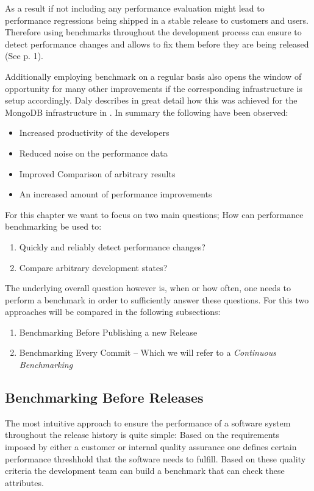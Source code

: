 \documentclass[	runningheads,
				a4paper]{llncs}
\begin{document}
	As a result if not including any performance evaluation might lead to performance regressions being shipped in a stable release to customers and users. Therefore using benchmarks throughout the development process can ensure to detect performance changes and allows to fix them before they are being released (See \cite{daly2021} p. 1). 

	Additionally employing benchmark on a regular basis also opens the window of opportunity for many other improvements if the corresponding infrastructure is setup accordingly. Daly describes in great detail how this was achieved for the MongoDB infrastructure in \cite{daly2021}. In summary the following have been observed:
	\begin{itemize}
		\item Increased productivity of the developers
		\item Reduced noise on the performance data
		\item Improved Comparison of arbitrary results
		\item An increased amount of performance improvements
	\end{itemize}

	For this chapter we want to focus on two main questions; How can performance benchmarking be used to:
	\begin{enumerate}
		\item Quickly and reliably detect performance changes?
		\item Compare arbitrary development states?
	\end{enumerate}

	The underlying overall question however is, when or how often, one needs to perform a benchmark in order to sufficiently answer these questions. For this two approaches will be compared in the following subsections:
	\begin{enumerate}
		\item Benchmarking Before Publishing a new Release
		\item Benchmarking Every Commit -- Which we will refer to a \textit{Continuous Benchmarking}
	\end{enumerate}

	\subsection{Benchmarking Before Releases}
	The most intuitive approach to ensure the performance of a software system throughout the release history is quite simple: Based on the requirements imposed by either a customer or internal quality assurance one defines certain performance threshhold that the software needs to fulfill. Based on these quality criteria the development team can build a benchmark that can check these attributes.
\end{document}
